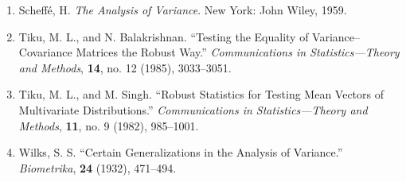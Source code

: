 \begin{enumerate}
\item Scheff\'e, H. \textit{The Analysis of Variance}. New York: John Wiley, 1959.

\item Tiku, M. L., and N. Balakrishnan. ``Testing the Equality of Variance--Covariance Matrices the Robust Way.'' \textit{Communications in Statistics---Theory and Methods}, \textbf{14}, no. 12 (1985), 3033--3051.

\item Tiku, M. L., and M. Singh. ``Robust Statistics for Testing Mean Vectors of Multivariate Distributions.'' \textit{Communications in Statistics---Theory and Methods}, \textbf{11}, no. 9 (1982), 985--1001.

\item Wilks, S. S. ``Certain Generalizations in the Analysis of Variance.'' \textit{Biometrika}, \textbf{24} (1932), 471--494.
\end{enumerate}

